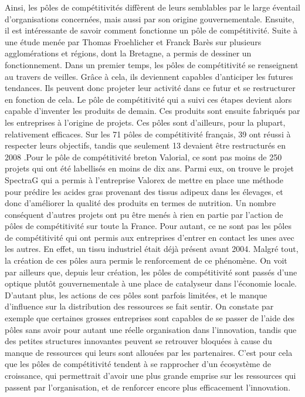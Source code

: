 \documentclass[a4paper,10pt]{report}
\begin{document}
		Ainsi, les pôles de compétitivités diffèrent de leurs semblables par le large éventail d’organisations concernées, mais aussi par son origine gouvernementale.
		Ensuite, il est intéressante de savoir comment fonctionne un pôle de compétitivité. Suite à une étude menée par Thomas Froehlicher et Franck Barès sur plusieurs agglomérations et régions, dont la Bretagne, a permis de dessiner un fonctionnement. Dans un premier temps, les pôles de compétitivité se renseignent au travers de veilles. Grâce à cela, ils deviennent capables d’anticiper les futures tendances. Ils peuvent donc projeter leur activité dans ce futur et se restructurer en fonction de cela. Le pôle de compétitivité qui a suivi ces étapes devient alors capable d’inventer les produits de demain. Ces produits sont ensuite fabriqués par les entreprises à l’origine de projets.
		Ces pôles sont d’ailleurs, pour la plupart, relativement efficaces. Sur les 71 pôles de compétitivité français, 39 ont réussi à respecter leurs objectifs, tandis que seulement 13 devaient être restructurés en 2008 .Pour le pôle de compétitivité breton Valorial, ce sont pas moins de 250 projets qui ont été labellisés en moins de dix ans. Parmi eux, on trouve le projet SpectraG qui a permis à l’entreprise Valorex de mettre en place une méthode pour prédire les acides gras provenant des tissus adipeux dans les élevages, et donc d’améliorer la qualité des produits en termes de nutrition. Un nombre conséquent d’autres projets ont pu être menés à rien en partie par l’action de pôles de compétitivité sur toute la France.
		Pour autant, ce ne sont pas les pôles de compétitivité qui ont permis aux entreprises d’entrer en contact les unes avec les autres. En effet, un tissu industriel était déjà présent avant 2004. Malgré tout, la création de ces pôles aura permis le renforcement de ce phénomène. On voit par ailleurs que, depuis leur création, les pôles de compétitivité sont passés d’une optique plutôt gouvernementale à une place de catalyseur dans l’économie locale.
		D’autant plus, les actions de ces pôles sont parfois limitées, et le manque d’influence sur la distribution des ressources se fait sentir. On constate par exemple que certaines grosses entreprises sont capables de se passer de l’aide des pôles sans avoir pour autant une réelle organisation dans l’innovation, tandis que des petites structures innovantes peuvent se retrouver bloquées à cause du manque de ressources qui leurs sont allouées par les partenaires.
		C’est pour cela que les pôles de compétitivité tendent à se rapprocher d’un écosystème de croissance, qui permettrait d’avoir une plus grande emprise sur les ressources qui passent par l’organisation, et de renforcer encore plus efficacement l’innovation.
		
\end{document}
